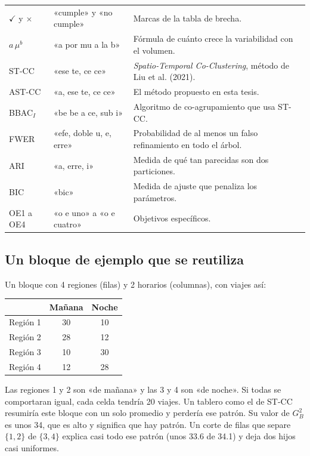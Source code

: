 \documentclass[11pt,a4paper]{article}
\begin{document}
\begin{center}
\begin{longtable}{@{}>{\centering\arraybackslash}p{2.6cm}>{\raggedright\arraybackslash}p{4.8cm}>{\raggedright\arraybackslash}p{8.0cm}@{}}
$\checkmark$ y $\times$ & «cumple» y «no cumple» & Marcas de la tabla de brecha. \\
$a\,\mu^b$ & «a por mu a la b» & Fórmula de cuánto crece la variabilidad con el volumen. \\
\midrule
ST-CC & «ese te, ce ce» & \emph{Spatio-Temporal Co-Clustering}, método de Liu et al. (2021). \\
AST-CC & «a, ese te, ce ce» & El método propuesto en esta tesis. \\
BBAC$_I$ & «be be a ce, sub i» & Algoritmo de co-agrupamiento que usa ST-CC. \\
FWER & «efe, doble u, e, erre» & Probabilidad de al menos un falso refinamiento en todo el árbol. \\
ARI & «a, erre, i» & Medida de qué tan parecidas son dos particiones. \\
BIC & «bic» & Medida de ajuste que penaliza los parámetros. \\
OE1 a OE4 & «o e uno» a «o e cuatro» & Objetivos específicos. \\
\bottomrule
\end{longtable}
\end{center}

\subsection*{Un bloque de ejemplo que se reutiliza}

Un bloque con 4 regiones (filas) y 2 horarios (columnas), con viajes así:

\begin{center}
\begin{tabular}{@{}lcc@{}}
\toprule
 & Mañana & Noche \\
\midrule
Región 1 & 30 & 10 \\
Región 2 & 28 & 12 \\
Región 3 & 10 & 30 \\
Región 4 & 12 & 28 \\
\bottomrule
\end{tabular}
\end{center}

Las regiones 1 y 2 son «de mañana» y las 3 y 4 son «de noche». Si todas se comportaran igual, cada celda tendría 20 viajes. Un tablero como el de ST-CC resumiría este bloque con un solo promedio y perdería ese patrón. Su valor de $G^2_B$ es unos 34, que es alto y significa que hay patrón. Un corte de filas que separe $\{1,2\}$ de $\{3,4\}$ explica casi todo ese patrón (unos 33.6 de 34.1) y deja dos hijos casi uniformes.
\end{document}
